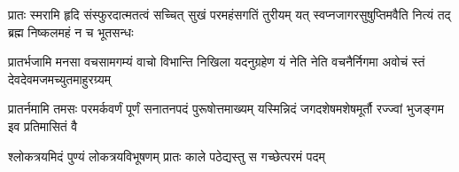 
\fourlineindentedshloka
{प्रातः स्मरामि हृदि संस्फुरदात्मतत्वं}
{सच्चित् सुखं परमहंसगतिं तुरीयम्}
{यत् स्वप्नजागरसुषुप्तिमवैति नित्यं}
{तद् ब्रह्म निष्कलमहं न च भूतसन्धः}

\fourlineindentedshloka
{प्रातर्भजामि मनसा वचसामगम्यं}
{वाचो विभान्ति निखिला यदनुग्रहेण}
{यं नेति नेति वचनैर्निगमा अवोचं}
{स्तं देवदेवमजमच्युतमाहुरग्र्यम्}

\fourlineindentedshloka
{प्रातर्नमामि तमसः परमर्कवर्णं}
{पूर्णं सनातनपदं पुरूषोत्तमाख्यम्}
{यस्मिन्निदं जगदशेषमशेषमूर्तौ}
{रज्ज्वां भुजङ्गम इव प्रतिमासितं वै}

\twolineshloka
{श्लोकत्रयमिदं पुण्यं लोकत्रयविभूषणम्}
{प्रातः काले पठेद्यस्तु स गच्छेत्परमं पदम्}


\closesection
